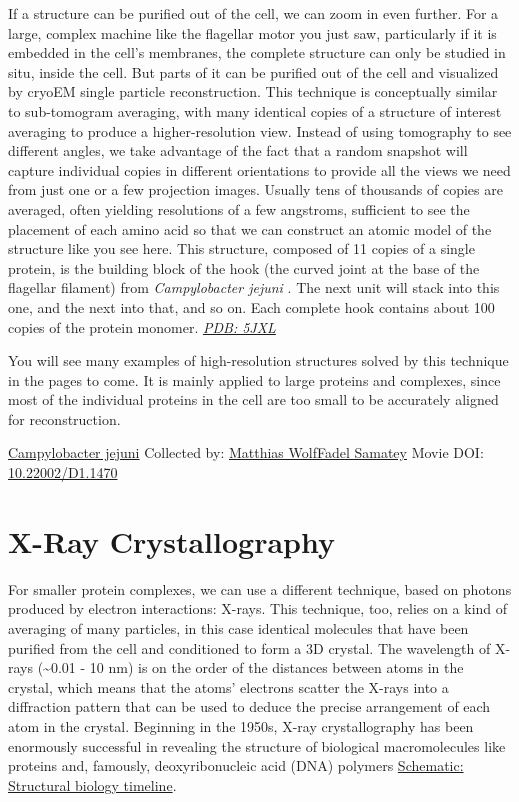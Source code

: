 \documentclass[]{tufte-book}
\begin{document}
If a structure can be purified out of the cell, we can zoom in even further. For a large, complex machine like the flagellar motor you just saw, particularly if it is embedded in the cell's membranes, the complete structure can only be studied in situ, inside the cell. But parts of it can be purified out of the cell and visualized by cryoEM single particle reconstruction. This technique is conceptually similar to sub-tomogram averaging, with many identical copies of a structure of interest averaging to produce a higher-resolution view. Instead of using tomography to see different angles, we take advantage of the fact that a random snapshot will capture individual copies in different orientations to provide all the views we need from just one or a few projection images. Usually tens of thousands of copies are averaged, often yielding resolutions of a few angstroms, sufficient to see the placement of each amino acid so that we can construct an atomic model of the structure like you see here. This structure, composed of 11 copies of a single protein, is the building block of the hook (the curved joint at the base of the flagellar filament) from \emph{Campylobacter jejuni} \citep{matsunami2016}. The next unit will stack into this one, and the next into that, and so on. Each complete hook contains about 100 copies of the protein monomer. \href{http://rcsb.org/structure/5JXL}{\emph{PDB: 5JXL}}

You will see many examples of high-resolution structures solved by this technique in the pages to come. It is mainly applied to large proteins and complexes, since most of the individual proteins in the cell are too small to be accurately aligned for reconstruction.



\hypertarget{htmlwidget-28dd80d2223fbe452896}{}

\label{fig:1-8}\protect\hyperlink{tree}{Campylobacter jejuni} Collected by: \protect\hyperlink{matthias_wolffadel_samatey}{Matthias WolfFadel Samatey} Movie DOI: \href{https://doi.org/10.22002/D1.1470}{10.22002/D1.1470}

\hypertarget{x-ray-crystallography}{%
\section{X-Ray Crystallography}\label{x-ray-crystallography}}

For smaller protein complexes, we can use a different technique, based on photons produced by electron interactions: X-rays. This technique, too, relies on a kind of averaging of many particles, in this case identical molecules that have been purified from the cell and conditioned to form a 3D crystal. The wavelength of X-rays (\textasciitilde{}0.01 - 10 nm) is on the order of the distances between atoms in the crystal, which means that the atoms' electrons scatter the X-rays into a diffraction pattern that can be used to deduce the precise arrangement of each atom in the crystal. Beginning in the 1950s, X-ray crystallography has been enormously successful in revealing the structure of biological macromolecules like proteins and, famously, deoxyribonucleic acid (DNA) polymers \protect\hyperlink{Structural_biology_timeline}{Schematic: Structural biology timeline}.
\end{document}
